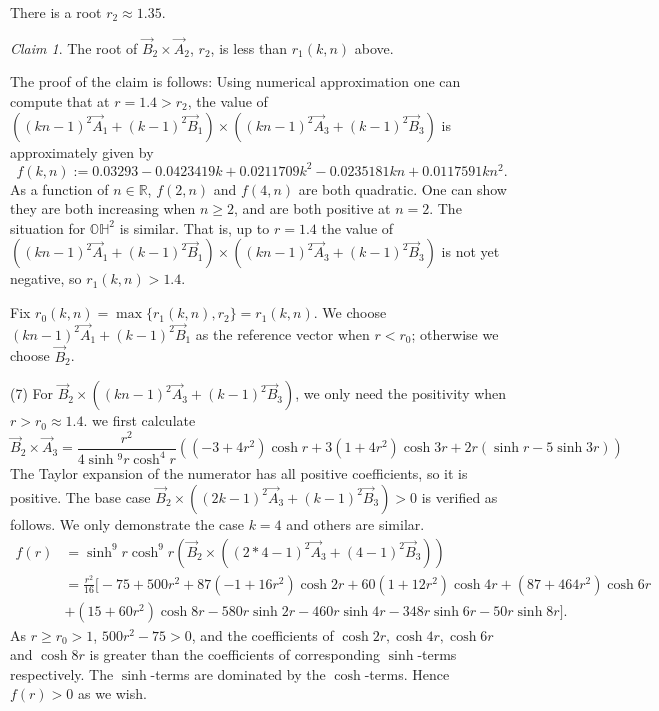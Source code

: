 \documentclass{amsart}
\numberwithin{equation}{section}
\theoremstyle{plain}
\theoremstyle{definition}
\theoremstyle{remark}
\newtheorem*{claim}{Claim}
\def\RR {\mathbb{R}}
\def\HH {\mathbb{H}}
\def\OO {\mathbb{O}}
\begin{document}
There is a root $r_2 \approx 1.35$. 
\begin{claim}
    The root of $\vec B_2 \times \vec A_2$,  $r_2$, is less than $r_1(k,n)$ above.
\end{claim}
The proof of the claim is follows: Using numerical approximation one can compute that at $r=1.4>r_2$, the value of  $((kn-1)^2\vec A_1+(k-1)^2\vec B_1)\times ((kn-1)^2\vec A_3+(k-1)^2\vec B_3)$ is approximately given by 
\[f(k,n):=0.03293-0.0423419 k+0.0211709 k^2-0.0235181 kn+0.0117591kn^2.\]
As a function of $n \in \RR$, $f(2,n)$ and $f(4,n)$ are both quadratic. One can show they are both increasing when $n\geq 2$, and are both positive at $n=2$. The situation for $\OO\HH^2$ is similar. That is, up to $r=1.4$ the value of $((kn-1)^2\vec A_1+(k-1)^2\vec B_1)\times ((kn-1)^2\vec A_3+(k-1)^2\vec B_3)$ is not yet negative, so $r_1(k,n)>1.4$.
\par Fix $r_0(k,n)= \max\{r_1(k,n), r_2\} =r_1(k,n) $. We choose $(kn-1)^2\vec A_1+(k-1)^2\vec B_1$ as the reference vector when $r<r_0$; otherwise we choose $\vec B_2$.




\par (7) For $\vec B_2 \times ((kn-1)^2\vec A_3+(k-1)^2\vec B_3)$, we only need the positivity when $r>r_0\approx 1.4$. we first calculate  
\[ \vec B_2 \times \vec A_3= \frac{r^2}{4\sinh{^9 r\cosh^4 r}}  \left(\left(-3+4 r^2\right) \operatorname{cosh}r+3\left(1+4 r^2\right) \operatorname{cosh}3r+2 r(\operatorname{sinh}r-5 \operatorname{sinh}3r)\right)\]
The Taylor expansion of the numerator has all positive coefficients, so it is positive.
 The base case $\vec B_2 \times ((2k-1)^2\vec A_3+(k-1)^2\vec B_3)>0$ is verified as follows. We only demonstrate the case $k=4$ and others are similar.
 \begin{align*}
     f(r)&= \sinh^9{r}\cosh^9{r}(\vec B_2 \times ((2*4-1)^2\vec A_3+(4-1)^2\vec B_3))\\
     &= \frac{r^2}{16}\big\lbrack-75+500r^2+87(-1+16r^2)\cosh{2r}+60\left(1+12 r^2\right) \operatorname{cosh}{4r}+(87+464r^2) \operatorname{cosh}{6r}\\
     &+(15+60r^2)\cosh{8r}-580 r \operatorname{sinh}{2r}-460 r \operatorname{sinh}{4r}-348 r \operatorname{sinh}{6 r}-50 r \operatorname{sinh}{8r}\big\rbrack.
 \end{align*}
As $r\geq r_0> 1$, $500r^2-75>0$, and the coefficients of $\cosh{2r}, \cosh{4r}, \cosh{6r}$ and $\cosh{8r}$ is greater than the coefficients of corresponding $\sinh$-terms respectively. The $\sinh$-terms are dominated by the $\cosh$-terms. Hence $f(r)>0$ as we wish.
\end{document}

